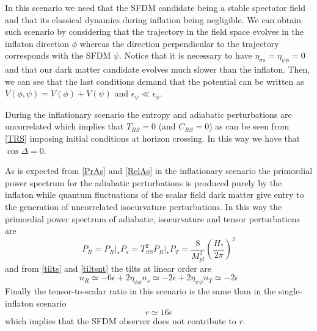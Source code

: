 \documentclass[twocolumn,           %
               showpacs,            %
               preprintnumbers,     %
               aps,                 %
               prl,          	    %
               letterpaper,             %
               superscriptaddress,      %
               nofootinbib,         %
               tightenlines,        %
               floats,floatfix      %
               ,usenatbib,
               ]{revtex4-1}
\begin{document}
In this scenario we need that the SFDM candidate being a stable spectator field and that its classical dynamics during inflation being negligible. We can obtain such scenario by considering that the trajectory in the field space evolves in the inflaton direction $\phi$ whereas the direction perpendicular to the trajectory corresponds with the SFDM $\psi$. Notice that it is necessary to have $\eta_{\sigma s}=\eta_{\psi\phi}=0$ and that our dark matter candidate evolves much slower than the inflaton. Then, we can see that the last conditions demand that the potential can be written as $V(\phi,\psi)=V(\phi)+V(\psi)$ and $\epsilon_\psi\ll \epsilon_\phi$.

During the inflationary scenario the entropy and adiabatic perturbations are uncorrelated which implies that $T_{RS}=0$ (and $C_{RS}=0$) as can be seen from \eqref{TRS} imposing initial conditions at horizon crossing. In this way we have that $\cos\Delta =0$. 

As is expected from \eqref{PrAs} and \eqref{RelAs} in the inflationary scenario the primordial power spectrum for the adiabatic perturbations is produced purely by the inflaton while quantum fluctuations of the scalar field dark matter give entry to the generation of uncorrelated isocurvature perturbations. In this way the primordial power spectrum of adiabatic, isocurvature and tensor perturbations are
\begin{subequations}
\begin{equation}
P_R=P_R|_*
\end{equation}
\begin{equation}\label{PS1}
P_s=T_{SS}^2 P_R|_*
\end{equation}
\begin{equation}
P_T=\frac{8}{M_{pl}^2}\left(\frac{H_*}{2\pi}\right)^2
\end{equation}
\end{subequations}
and from \eqref{tilts} and \eqref{tiltsnt} the tilts at linear order are
\begin{subequations}
\begin{equation}
n_R\simeq-6\epsilon+2\eta_{\phi\phi}
\end{equation}
\begin{equation}
n_s\simeq-2\epsilon+2\eta_{\psi\psi}
\end{equation}
\begin{equation}
n_T\simeq -2\epsilon
\end{equation}
\end{subequations}
Finally the tensor-to-scalar ratio in this scenario is the same than in the single-inflaton scenario
\begin{equation}
r\simeq 16\epsilon
\end{equation}
which implies that the SFDM observer does not contribute to $r$.
\end{document}
